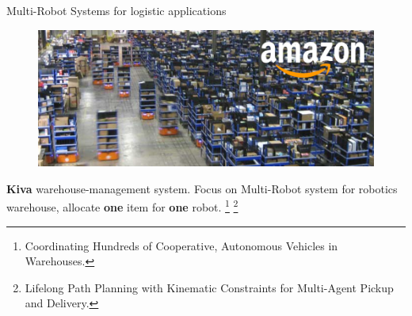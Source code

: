     \begin{frame}[fragile]{Multi-Robot Systems for logistic applications}

        \begin{figure}[hbt]
            \centering
            \includegraphics[width=\textwidth]{img/kiva.png}
        \end{figure}
        
        
    {\bf Kiva} warehouse-management system. 
    Focus on Multi-Robot system for robotics warehouse, allocate {\bf one} item for {\bf one} robot.
    {\let\thefootnote\relax\footnote{{Coordinating Hundreds of
    Cooperative, Autonomous
    Vehicles in Warehouses.}}}
    {\let\thefootnote\relax\footnote{{Lifelong Path Planning with Kinematic Constraints
    for Multi-Agent Pickup and Delivery.}}}
    \end{frame}

